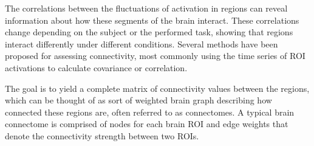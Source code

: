 		The correlations between the fluctuations of activation in regions can reveal information about how these segments of the brain interact. These correlations change depending on the subject or the performed task, showing that regions interact differently under different conditions. Several methods have been proposed for assessing connectivity, most commonly using the time series of ROI activations to calculate covariance or correlation\cite{VAROQUAUX2013405}.
		
		The goal is to yield a complete matrix of connectivity values between the regions, which can be thought of as sort of weighted brain graph describing how connected these regions are, often referred to as connectomes. A typical brain connectome is comprised of nodes for each brain ROI and edge weights that denote the connectivity strength between two ROIs\cite{bassett2017network}.
		
		